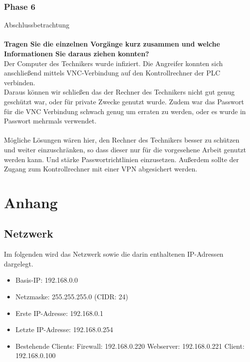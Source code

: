 \documentclass[
    a4paper,
    pagesize,
	pdftex,
    12pt,
]{scrartcl}
\begin{document}
\subsubsection{Phase 6}
Abschlussbetrachtung
\\ \\
\textbf{Tragen Sie die einzelnen Vorgänge kurz zusammen und welche Informationen Sie daraus ziehen konnten?}
\\
Der Computer des Technikers wurde infiziert. Die Angreifer konnten sich anschließend mittels VNC-Verbindung auf den Kontrollrechner der PLC  verbinden. \\
Daraus können wir schließen das der Rechner des Technikers nicht gut genug geschützt war, oder für private Zwecke genutzt wurde. Zudem war das Passwort für die VNC Verbindung schwach genug um erraten zu werden, oder es wurde in Passwort mehrmals verwendet.
\\ \\
Mögliche Lösungen wären hier, den Rechner des Technikers besser zu schützen und weiter einzuschränken, so dass dieser nur für die vorgesehene Arbeit genutzt werden kann. Und stärke Passwortrichtlinien einzusetzen. Außerdem sollte der Zugang zum Kontrollrechner mit einer VPN abgesichert werden. 

\newpage
\section{Anhang}

\subsection{Netzwerk}
Im folgenden wird das Netzwerk sowie die darin enthaltenen IP-Adressen dargelegt.
\begin{itemize}
	\item Basis-IP: 192.168.0.0
	\item Netzmaske: 255.255.255.0 (CIDR: 24)
	\item Erste IP-Adresse: 192.168.0.1
	\item Letzte IP-Adresse: 192.168.0.254
	\item Bestehende Clients:
		\subitem Firewall: 192.168.0.220
		\subitem Webserver: 192.168.0.221
		\subitem Client: 192.168.0.100
\end{itemize}
\end{document}
